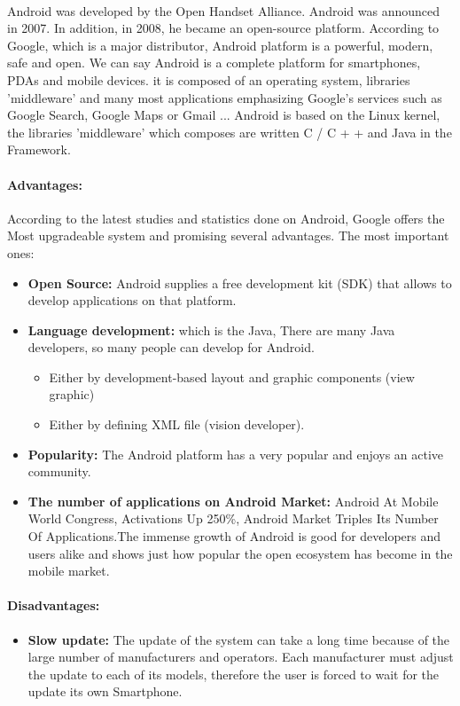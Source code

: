 \paragraph{} Android was developed by the Open Handset Alliance. Android was announced in 2007. In addition, in 2008, he became an open-source platform.
 According to Google, which is a major distributor, Android platform is a powerful, modern, safe and open. We can say Android is a complete platform for smartphones, PDAs and mobile devices. it is
composed of an operating system, libraries 'middleware' and many most applications emphasizing Google's services such as Google
Search, Google Maps or Gmail ...
Android is based on the Linux kernel, the libraries 'middleware' which composes are written
C / C + + and Java in the Framework.
\paragraph{Advantages: }
According to the latest studies and statistics done on Android, Google offers the Most upgradeable system and promising several advantages.
 The most important ones:
\begin{itemize}
 \item \textbf{Open Source: }Android supplies a free development kit (SDK) that allows to develop applications on that platform.
 \item \textbf{Language development:} which is the Java, There are many Java developers, so many people can develop for Android.
	    \begin{itemize}
	     \item Either by development-based layout and graphic components (view graphic)
	     \item Either by defining XML file (vision developer).
	    \end{itemize}

 \item \textbf{Popularity: }The Android platform has a very popular and enjoys an active community.
 \item \textbf{The number of applications on Android Market: }Android At Mobile World Congress, Activations Up 250\%, Android Market Triples Its Number Of Applications.The immense growth of Android is good for developers and users alike and shows just how popular the open ecosystem has become in the mobile market.
\end{itemize}

\paragraph{Disadvantages: }
\begin{itemize}
 \item \textbf{Slow update: }The update of the system can take a long time because of the large number of manufacturers and operators. 
Each manufacturer must adjust the update to each of its models, therefore the user is forced to wait for the update its own Smartphone.
\end{itemize}

